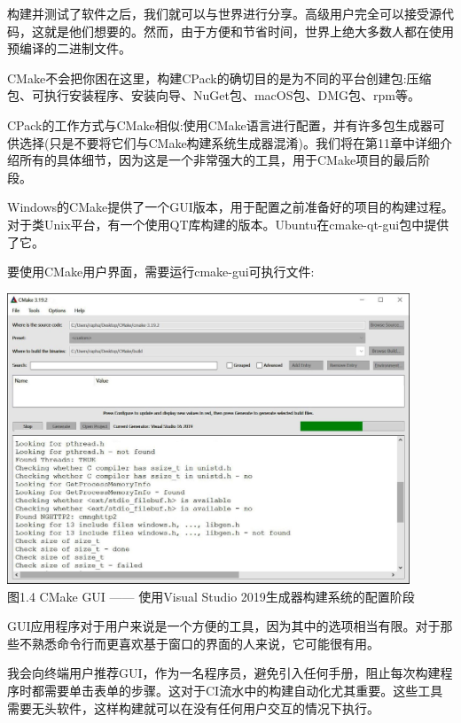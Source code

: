 
构建并测试了软件之后，我们就可以与世界进行分享。高级用户完全可以接受源代码，这就是他们想要的。然而，由于方便和节省时间，世界上绝大多数人都在使用预编译的二进制文件。

CMake不会把你困在这里，构建CPack的确切目的是为不同的平台创建包:压缩包、可执行安装程序、安装向导、NuGet包、macOS包、DMG包、rpm等。

CPack的工作方式与CMake相似:使用CMake语言进行配置，并有许多包生成器可供选择(只是不要将它们与CMake构建系统生成器混淆)。我们将在第11章中详细介绍所有的具体细节，因为这是一个非常强大的工具，用于CMake项目的最后阶段。


Windows的CMake提供了一个GUI版本，用于配置之前准备好的项目的构建过程。对于类Unix平台，有一个使用QT库构建的版本。Ubuntu在cmake-qt-gui包中提供了它。

要使用CMake用户界面，需要运行cmake-gui可执行文件:

\begin{center}
\includegraphics[width=0.9\textwidth]{content/1/chapter1/images/4.jpg}\\
图1.4  CMake GUI —— 使用Visual Studio 2019生成器构建系统的配置阶段
\end{center}

GUI应用程序对于用户来说是一个方便的工具，因为其中的选项相当有限。对于那些不熟悉命令行而更喜欢基于窗口的界面的人来说，它可能很有用。

\begin{tcolorbox}[colback=red!5!white,colframe=red!75!black,title=不推荐]
我会向终端用户推荐GUI，作为一名程序员，避免引入任何手册，阻止每次构建程序时都需要单击表单的步骤。这对于CI流水中的构建自动化尤其重要。这些工具需要无头软件，这样构建就可以在没有任何用户交互的情况下执行。
\end{tcolorbox}

